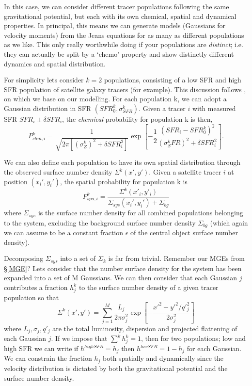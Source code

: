 In this case, we can consider different tracer populations following the same gravitational potential, but each with its own chemical, spatial and dynamical properties. In principal, this means we can generate models (Gaussians for velocity moments) from the Jeans equations for as many as different populations as we like. This only really worthwhile doing if your populations are \textit{distinct}; i.e. they can actually be split by a `chemo' property and show distinctly different dynamics and spatial distribution. 

For simplicity lets consider $k=2$ populations, consisting of a low SFR and high SFR population of satellite galaxy tracers (for example). This discussion follows \citet{zhu16sculptor}, on which we base on our modelling. For each population k, we can adopt a Gaussian distribution in SFR $(SFR^{k}_{0},\sigma^{k}_{SFR})$. Given a tracer $i$ with measured SFR $SFR_i \pm \delta SFR_i$, the \textit{chemical} probability for population k is then,
\begin{equation}
P_{chm,i}^{k} = \frac{1}{\sqrt{2\pi [(\sigma^{k}_{Z})^2+ \delta SFR_{i}^2]}}\exp{\left[-\frac{1}{2}\frac{(SFR_{i}-SFR^k_0)^2}{(\sigma^k_SFR)^2+\delta SFR_i^2}\right]}. 
\end{equation}

We can also define each population to have its own spatial distribution through the observed surface number density $\Sigma^k(x',y')$. Given a satellite tracer $i$ at position $(x_i',y_i')$, the spatial probability for population k is
\begin{equation}
P^{k}_{spa,i} = \frac{\Sigma^k(x'_i,y'_i)}{\Sigma_{sys}(x_i',y_i')+\Sigma_{bg}}
\end{equation}
where $\Sigma_{sys}$ is the surface number density for all combined populations belonging to the system, excluding the background surface number density $\Sigma_{bg}$ (which again we can assume to be a constant fraction $\epsilon$ of the central object surface number density). 

Decomposing $\Sigma_{sys}$ into a set of $\Sigma_{k}$ is far from trivial.  Remember our MGEs from \S\ref{MGE}? Lets consider that the number surface density for the system has been expanded into a set of M Gaussians. We can then consider that each Gaussian $j$ contributes a fraction $h^{k}_{j}$ to the surface number density of a given tracer population so that
\begin{equation}
\Sigma^{k}(x',y') = \sum^{M}_{j=1} \frac{L_j}{2\pi \sigma^2_j} \exp{\left[-\frac{x'^2 + y'^2 /q'^2_j}{2\sigma^2_j}\right]}
\end{equation}
where $L_j,\sigma_j,q'_j$ are the total luminosity, dispersion and projected flattening of each Gaussian $j$. If we impose that $\sum^k h^k_j = 1$, then for two populations; low and high SFR we can write if $h^{high SFR} = h_j$ then $h^{low SFR} = 1 - h_j$ for each Gaussian. We can constrain the fraction $h_j$ both spatially and dynamically since the velocity distribution is dictated by both the gravitational potential and the surface number density.

